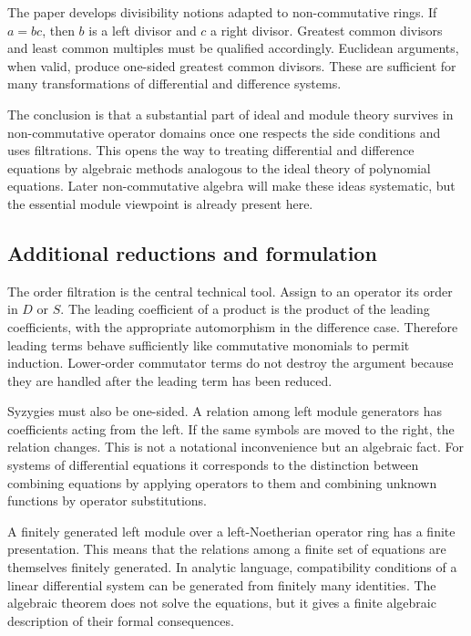 \documentclass[12pt]{article}
\begin{document}
The paper develops divisibility notions adapted to non-commutative rings. If \(a=bc\), then \(b\) is
a left divisor and \(c\) a right divisor. Greatest common divisors and least common multiples must
be qualified accordingly. Euclidean arguments, when valid, produce one-sided greatest common
divisors. These are sufficient for many transformations of differential and difference systems.


The conclusion is that a substantial part of ideal and module theory survives in non-commutative
operator domains once one respects the side conditions and uses filtrations. This opens the way to
treating differential and difference equations by algebraic methods analogous to the ideal theory of
polynomial equations. Later non-commutative algebra will make these ideas systematic, but the
essential module viewpoint is already present here.


\subsection{Additional reductions and formulation}

The order filtration is the central technical tool. Assign to an operator its order in \(D\) or
\(S\). The leading coefficient of a product is the product of the leading coefficients, with the
appropriate automorphism in the difference case. Therefore leading terms behave sufficiently like
commutative monomials to permit induction. Lower-order commutator terms do not destroy the argument
because they are handled after the leading term has been reduced.

Syzygies must also be one-sided. A relation among left module generators has coefficients acting
from the left. If the same symbols are moved to the right, the relation changes. This is not a
notational inconvenience but an algebraic fact. For systems of differential equations it corresponds
to the distinction between combining equations by applying operators to them and combining unknown
functions by operator substitutions.

A finitely generated left module over a left-Noetherian operator ring has a finite presentation.
This means that the relations among a finite set of equations are themselves finitely generated. In
analytic language, compatibility conditions of a linear differential system can be generated from
finitely many identities. The algebraic theorem does not solve the equations, but it gives a finite
algebraic description of their formal consequences.
\end{document}
